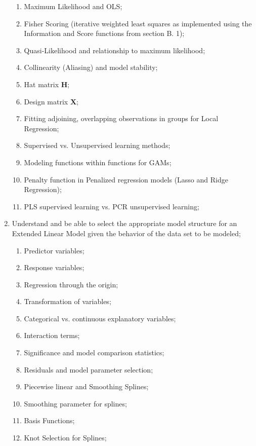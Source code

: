 \begin{outcomes}
\begin{enumerate}
\begin{knowledge}
	\begin{enumerate}[label = \alph*.]
		\item	Maximum Likelihood and OLS;
		\item	Fisher Scoring (iterative weighted least squares as implemented using the Information and Score functions from section B. 1);
		\item	Quasi-Likelihood and relationship to maximum likelihood;
		\item	Collinearity (Aliasing) and model stability; 
		\item	Hat matrix $\bm{H}$;
		\item	Design matrix $\bm{X}$;
		\item	Fitting adjoining, overlapping observations in groups for Local Regression;
		\item	Supervised vs. Unsupervised learning methods;
		\item	Modeling functions within functions for GAMs;
		\item	Penalty function in Penalized regression models (Lasso and Ridge Regression);
		\item	PLS supervised learning vs. PCR unsupervised learning;
	\end{enumerate}
	\end{knowledge}
\tcbline
	\item	Understand and be able to select the appropriate model structure for an Extended Linear Model given the behavior of the data set to be modeled;
	\begin{knowledge}
	\begin{enumerate}[label = \alph*.]
		\item	Predictor variables;
		\item	Response variables;
		\item	Regression through the origin;
		\item	Transformation of variables;
		\item	Categorical vs. continuous explanatory variables;
		\item	Interaction terms;
		\item	Significance and model comparison statistics;
		\item	Residuals and model parameter selection;
		\item	Piecewise linear and Smoothing Splines;
		\item	Smoothing parameter for splines;
		\item	Basis Functions;
		\item	Knot Selection for Splines;

\end{enumerate}
\end{knowledge}
\end{enumerate}
\end{outcomes}
